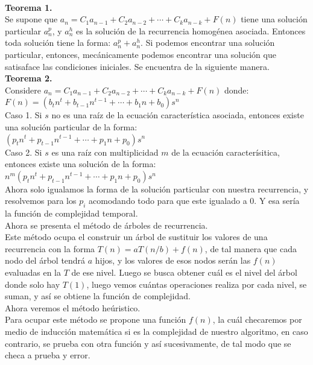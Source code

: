 \documentclass[12pt,twoside]{article}
\begin{document}
\\ \textbf{Teorema 1.}
\\ Se supone que $a_n=C_1a_{n-1}+C_2a_{n-2}+\dotsm+C_ka_{n-k}+F(n)$ tiene una solución particular $a_n^p$, y $a_n^h$ es la solución de la recurrencia homogénea asociada. Entonces toda solución tiene la forma: $a_n^p+a_n^h$. Si podemos encontrar una solución particular, entonces, mecánicamente podemos encontrar una solución que satisaface las condiciones iniciales. Se encuentra de la siguiente manera.
\\ \textbf{Teorema 2.}
\\ Considere $a_n=C_1a_{n-1}+C_2a_{n-2}+\dotsm+C_ka_{n-k}+F(n)$ donde: 
\\ $F(n)=(b_tn^t+b_{t-1}n^{t-1}+\dotsb+b_1n+b_0)s^n$
\\ Caso 1. Si $s$ no es una raíz de la ecuación característica asociada, entonces existe una solución particular de la forma:
\\ $(p_tn^t+p_{t-1}n^{t-1}+\dotsb+p_1n+p_0)s^n$
\\ Caso 2. Si $s$ es una raíz con multiplicidad $m$ de la ecuación caracterísitica, entonces existe una solución de la forma:
\\ $n^m(p_tn^t+p_{t-1}n^{t-1}+\dotsb+p_1n+p_0)s^n$
\\ Ahora solo igualamos la forma de la solución particular con nuestra recurrencia, y resolvemos para los $p_i$ acomodando todo para que este igualado a 0. Y esa sería la función de complejidad temporal.
\newline
\\ Ahora se presenta el método de árboles de recurrencia.
\\ Este método ocupa el construir un árbol de sustituir los valores de una recurrencia con la forma $T(n)=aT(n/b)+f(n)$, de tal manera que cada nodo del árbol tendrá $a$ hijos, y los valores de esos nodos serán las $f(n)$ evaluadas en la $T$ de ese nivel. Luego se busca obtener cuál es el nivel del árbol donde solo hay $T(1)$, luego vemos cuántas operaciones realiza por cada nivel, se suman, y así se obtiene la función de complejidad.
\newline
\\ Ahora veremos el método heúristico.
\\ Para ocupar este método se propone una función $f(n)$, la cuál checaremos por medio de inducción matemática si es la complejidad de nuestro algoritmo, en caso contrario, se prueba con otra función y así sucesivamente, de tal modo que se checa a prueba y error.
\newline
\end{document}
